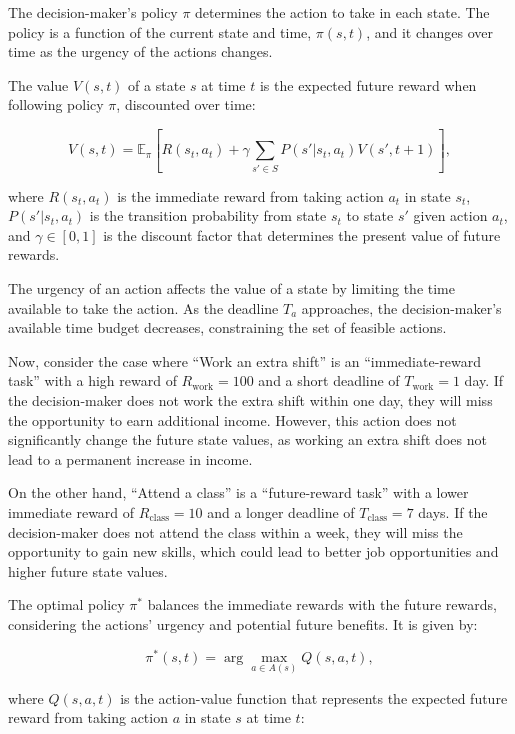 \documentclass[
]{report}
\begin{document}
The decision-maker's policy \(\pi\) determines the action to take in
each state. The policy is a function of the current state and time,
\(\pi(s, t)\), and it changes over time as the urgency of the actions
changes.

The value \(V(s, t)\) of a state \(s\) at time \(t\) is the expected
future reward when following policy \(\pi\), discounted over time:

\[V(s, t) = \mathbb{E}_{\pi}\left[R(s_t, a_t) + \gamma \sum_{s' \in S} P(s' | s_t, a_t) V(s', t+1)\right],\]

where \(R(s_t, a_t)\) is the immediate reward from taking action \(a_t\)
in state \(s_t\), \(P(s' | s_t, a_t)\) is the transition probability
from state \(s_t\) to state \(s'\) given action \(a_t\), and
\(\gamma \in [0, 1]\) is the discount factor that determines the present
value of future rewards.

The urgency of an action affects the value of a state by limiting the
time available to take the action. As the deadline \(T_a\) approaches,
the decision-maker's available time budget decreases, constraining the
set of feasible actions.

Now, consider the case where ``Work an extra shift'' is an
``immediate-reward task'' with a high reward of
\(R_{\text{work}} = 100\) and a short deadline of
\(T_{\text{work}} = 1\) day. If the decision-maker does not work the
extra shift within one day, they will miss the opportunity to earn
additional income. However, this action does not significantly change
the future state values, as working an extra shift does not lead to a
permanent increase in income.

On the other hand, ``Attend a class'' is a ``future-reward task'' with a
lower immediate reward of \(R_{\text{class}} = 10\) and a longer
deadline of \(T_{\text{class}} = 7\) days. If the decision-maker does
not attend the class within a week, they will miss the opportunity to
gain new skills, which could lead to better job opportunities and higher
future state values.

The optimal policy \(\pi^*\) balances the immediate rewards with the
future rewards, considering the actions' urgency and potential future
benefits. It is given by:

\[\pi^*(s, t) = \arg\max_{a \in A(s)} Q(s, a, t),\]

where \(Q(s, a, t)\) is the action-value function that represents the
expected future reward from taking action \(a\) in state \(s\) at time
\(t\):
\end{document}
